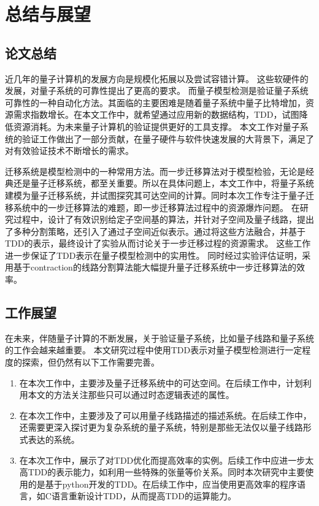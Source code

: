 \chapter{总结与展望}
\section{论文总结}

近几年的量子计算机的发展方向是规模化拓展以及尝试容错计算。
这些软硬件的发展，对量子系统的可靠性提出了更高的要求。
而量子模型检测是验证量子系统可靠性的一种自动化方法。其面临的主要困难是随着量子系统中量子比特增加，资源需求指数增长。在本文工作中，就希望通过应用新的数据结构，TDD，试图降低资源消耗。为未来量子计算机的验证提供更好的工具支撑。
本文工作对量子系统的验证工作做出了一部分贡献，在量子硬件与软件快速发展的大背景下，满足了对有效验证技术不断增长的需求。

迁移系统是模型检测中的一种常用方法。而一步迁移算法对于模型检验，无论是经典还是量子迁移系统，都至关重要。所以在具体问题上，本文工作中，将量子系统建模为量子迁移系统，并试图探究其可达空间的计算。同时本次工作专注于量子迁移系统中的一步迁移算法的难题，即一步迁移算法过程中的资源爆炸问题。
在研究过程中，设计了有效识别给定子空间基的算法，并针对子空间及量子线路，提出了多种分割策略，还引入了通过子空间近似表示。通过将这些方法融合，并基于TDD的表示，最终设计了实验从而讨论关于一步迁移过程的资源需求。
这些工作进一步保证了TDD表示在量子模型检测中的实用性。
同时经过实验评估证明，采用基于contraction的线路分割算法能大幅提升量子迁移系统中一步迁移算法的效率。


\section{工作展望}

在未来，伴随量子计算的不断发展，关于验证量子系统，比如量子线路和量子系统的工作会越来越重要。
本文研究过程中使用TDD表示对量子模型检测进行一定程度的探索，但仍然有以下工作需要完善。
\begin{enumerate}
    \item 在本次工作中，主要涉及量子迁移系统中的可达空间。在后续工作中，计划利用本文的方法关注那些只可以通过时态逻辑表述的属性。
    \item 在本次工作中，主要涉及了可以用量子线路描述的描述系统。在后续工作中，还需要更深入探讨更为复杂系统的量子系统，特别是那些无法仅以量子线路形式表达的系统。
    \item 在本次工作中，展示了对TDD优化而提高效率的实例。后续工作中应进一步太高TDD的表示能力，如利用一些特殊的张量等价关系。同时本次研究中主要使用的是基于python开发的TDD。在后续工作中，应当使用更高效率的程序语言，如C语言重新设计TDD，从而提高TDD的运算能力。
\end{enumerate}

